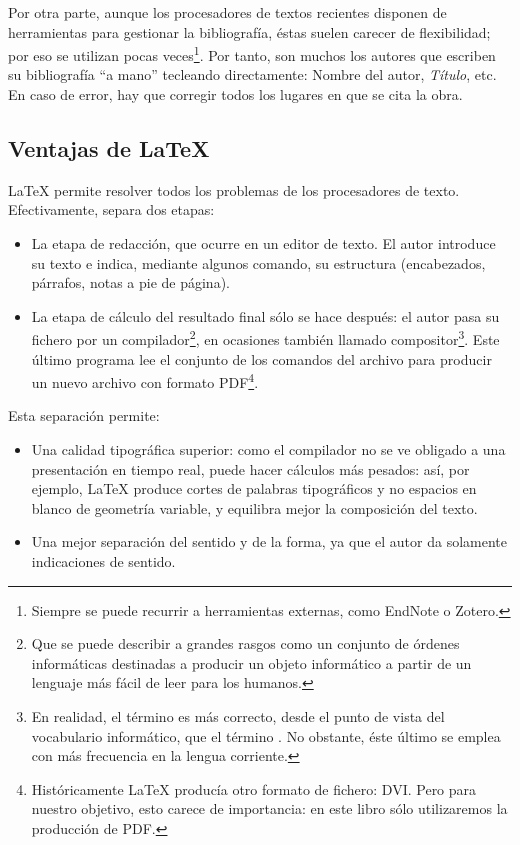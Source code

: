 Por otra parte, aunque los procesadores de textos recientes disponen de herramientas para gestionar la bibliografía, éstas suelen carecer de flexibilidad; por eso se utilizan pocas veces\footnote{Siempre se puede recurrir a herramientas externas, como EndNote o Zotero.}. Por tanto, son muchos los autores que escriben su bibliografía \enquote{a mano} tecleando directamente: Nombre del autor, \emph{Título}, etc. En caso de error, hay que corregir todos los lugares en que se cita la obra.

\subsection{Ventajas de \LaTeX{}}

\LaTeX{} permite resolver todos los problemas de los procesadores de texto. Efectivamente, separa dos etapas:
\begin{itemize}
\item La etapa de redacción, que ocurre en un editor de texto. El autor introduce su texto e indica, mediante algunos comando, su estructura (encabezados, párrafos, notas a pie de página).
\item La etapa de cálculo del resultado final sólo se hace después: el autor pasa su fichero por un compilador\footnote{Que se puede describir a grandes rasgos como un conjunto de órdenes informáticas destinadas a producir un objeto informático a partir de un lenguaje más fácil de leer para los humanos.}, en ocasiones también llamado compositor\footnote{En realidad, el término  es más correcto, desde el punto de vista del vocabulario informático, que el término . No obstante, éste último se emplea con más frecuencia en la lengua corriente.}. Este último programa lee el conjunto de los comandos del archivo para producir un nuevo archivo con formato PDF\footnote{Históricamente \LaTeX{} producía otro formato de fichero: DVI. Pero para nuestro objetivo, esto carece de importancia: en este libro sólo utilizaremos la producción de PDF.}.
\end{itemize}

Esta separación permite:
\begin{itemize}
\item  Una calidad tipográfica superior:  como el compilador no se ve obligado a una presentación en tiempo real, puede hacer cálculos más pesados: así, por ejemplo, \LaTeX{} produce cortes de palabras tipográficos y no espacios en blanco de geometría variable, y equilibra mejor la composición del texto.
\item Una mejor separación del sentido y de la forma, ya que el autor da solamente indicaciones de sentido.
\end{itemize}

